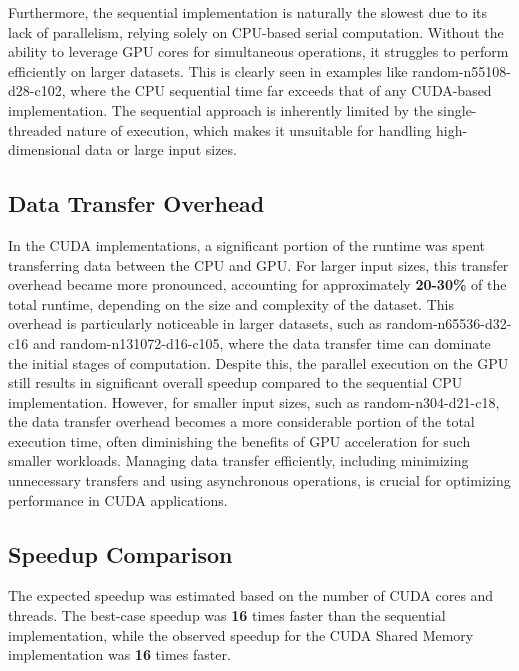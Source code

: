 \documentclass[letterpaper,12pt]{article}
\theoremstyle{remark}
\begin{document}
Furthermore, the sequential implementation is naturally the slowest due to its lack of parallelism, relying solely on CPU-based serial computation. Without the ability to leverage GPU cores for simultaneous operations, it struggles to perform efficiently on larger datasets. This is clearly seen in examples like random-n55108-d28-c102, where the CPU sequential time far exceeds that of any CUDA-based implementation. The sequential approach is inherently limited by the single-threaded nature of execution, which makes it unsuitable for handling high-dimensional data or large input sizes.

\subsection{Data Transfer Overhead} In the CUDA implementations, a significant portion of the runtime was spent transferring data between the CPU and GPU. For larger input sizes, this transfer overhead became more pronounced, accounting for approximately \textbf{20-30\%} of the total runtime, depending on the size and complexity of the dataset. This overhead is particularly noticeable in larger datasets, such as random-n65536-d32-c16 and random-n131072-d16-c105, where the data transfer time can dominate the initial stages of computation. Despite this, the parallel execution on the GPU still results in significant overall speedup compared to the sequential CPU implementation. However, for smaller input sizes, such as random-n304-d21-c18, the data transfer overhead becomes a more considerable portion of the total execution time, often diminishing the benefits of GPU acceleration for such smaller workloads. Managing data transfer efficiently, including minimizing unnecessary transfers and using asynchronous operations, is crucial for optimizing performance in CUDA applications.

\subsection{Speedup Comparison}
The expected speedup was estimated based on the number of CUDA cores and threads. The best-case speedup was \textbf{16} times faster than the sequential implementation, while the observed speedup for the CUDA Shared Memory implementation was \textbf{16} times faster.
\end{document}
